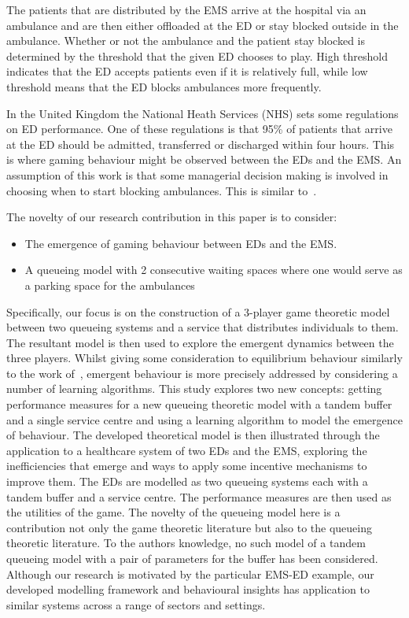 The patients that are distributed by the EMS arrive at the hospital via an 
ambulance and are then either offloaded at the ED or stay blocked outside in 
the ambulance.
Whether or not the ambulance and the patient stay blocked is determined by 
the threshold that the given ED chooses to play.
High threshold indicates that the ED accepts patients even if it is relatively 
full, while low threshold means that the ED blocks ambulances more frequently.

In the United Kingdom the National Heath Services (NHS) sets some regulations 
on ED performance.
One of these regulations is that 95\% of patients that arrive at the ED should 
be admitted, transferred or discharged within four hours.
This is where gaming behaviour might be observed between the EDs and the EMS.
An assumption of this work is that some managerial decision making is involved
in choosing when to start blocking ambulances.
This is similar to~\cite{deo2011centralized}.

The novelty of our research contribution in this paper is to consider:
\begin{itemize}
    \item The emergence of gaming behaviour between EDs and the EMS.
    \item A queueing model with 2 consecutive waiting spaces where one would 
    serve as a parking space for the ambulances
\end{itemize}
Specifically, our focus is on the construction of a 3-player game theoretic 
model between two queueing systems and a service that distributes individuals
to them. 
The resultant model is then used to explore the emergent dynamics between 
the three players.
Whilst giving some consideration to equilibrium behaviour similarly to the 
work of~\cite{FirmCompetition, FirmCompetition2, deo2011centralized, 
veltman2005equilibrium}, emergent behaviour is more precisely addressed by 
considering a number of learning algorithms.
This study explores two new concepts: getting performance measures for a new
queueing theoretic model with a tandem buffer and a single service centre and 
using a learning algorithm to model the emergence of behaviour.
The developed theoretical model is then illustrated through the application to 
a healthcare system of two EDs and the EMS, exploring the inefficiencies that 
emerge and ways to apply some incentive mechanisms to improve them.
The EDs are modelled as two queueing systems each with a tandem buffer and a 
service centre. 
The performance measures are then used as the utilities of the game.
The novelty of the queueing model here is a contribution not only the game 
theoretic literature but also to the queueing theoretic literature.
To the authors knowledge, no such model of a tandem queueing model with a pair 
of parameters for the buffer has been considered.
Although our research is motivated by the particular EMS-ED example, our 
developed modelling framework and behavioural insights has application to 
similar systems across a range of sectors and settings. 

